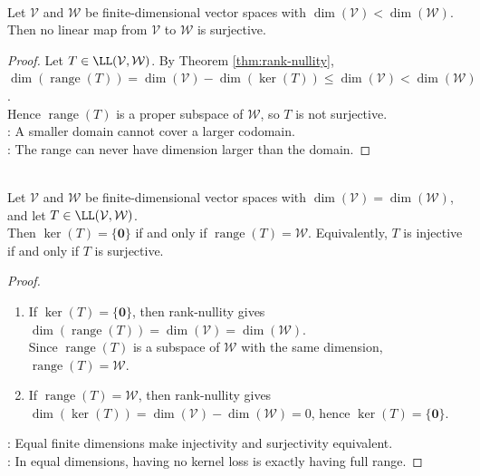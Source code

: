\begin{corollary} \label{cor:map-to-larger-space-not-surjective} \\
Let $\mathcal{V}$ and $\mathcal{W}$ be finite-dimensional vector spaces with $\dim(\mathcal{V})<\dim(\mathcal{W})$.\\
Then no linear map from $\mathcal{V}$ to $\mathcal{W}$ is surjective.
\begin{proof}
Let $T\in\LL(\mathcal{V},\mathcal{W})$. By Theorem \ref{thm:rank-nullity}, $\dim(\operatorname{range}(T))=\dim(\mathcal{V})-\dim(\ker(T))\leq\dim(\mathcal{V})<\dim(\mathcal{W})$.\\
Hence $\operatorname{range}(T)$ is a proper subspace of $\mathcal{W}$, so $T$ is not surjective.\\
: A smaller domain cannot cover a larger codomain.\\
: The range can never have dimension larger than the domain.
\end{proof}
\end{corollary}

\begin{corollary} \label{cor:equal-dimension-kernel-range} \\
Let $\mathcal{V}$ and $\mathcal{W}$ be finite-dimensional vector spaces with $\dim(\mathcal{V})=\dim(\mathcal{W})$, and let $T\in\LL(\mathcal{V},\mathcal{W})$.\\
Then $\ker(T)=\{\mathbf{0}\}$ if and only if $\operatorname{range}(T)=\mathcal{W}$. Equivalently, $T$ is injective if and only if $T$ is surjective.
\begin{proof}
\begin{enumerate}[label=\roman*.]
\setlength{\itemsep}{0pt}
\item[$(\Rightarrow)$] If $\ker(T)=\{\mathbf{0}\}$, then rank-nullity gives $\dim(\operatorname{range}(T))=\dim(\mathcal{V})=\dim(\mathcal{W})$.\\
Since $\operatorname{range}(T)$ is a subspace of $\mathcal{W}$ with the same dimension, $\operatorname{range}(T)=\mathcal{W}$.
\item[$(\Leftarrow)$] If $\operatorname{range}(T)=\mathcal{W}$, then rank-nullity gives $\dim(\ker(T))=\dim(\mathcal{V})-\dim(\mathcal{W})=0$, hence $\ker(T)=\{\mathbf{0}\}$.
\end{enumerate}
: Equal finite dimensions make injectivity and surjectivity equivalent.\\
: In equal dimensions, having no kernel loss is exactly having full range.
\end{proof}
\end{corollary}

